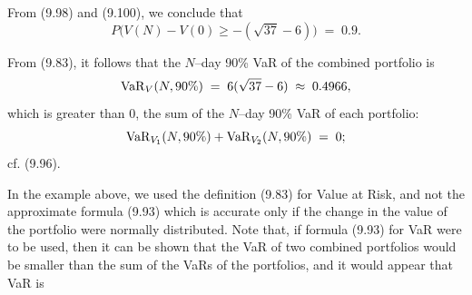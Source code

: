 From (9.98) and (9.100), we conclude that
\[
P\bigl(V(N)-V(0) \ge -(\sqrt{37}-6)\bigr) \;=\; 0.9.
\]

From (9.83), it follows that the $N$--day 90\% VaR of the combined portfolio
is
\begin{equation}
\operatorname{VaR}_V(N,90\%) \;=\; 6(\sqrt{37}-6) \;\approx\; 0.4966,
\end{equation}
which is greater than 0, the sum of the $N$--day 90\% VaR of each portfolio:
\[
\operatorname{VaR}_{V_1}(N,90\%) + \operatorname{VaR}_{V_2}(N,90\%) \;=\; 0;
\]
cf. (9.96).

In the example above, we used the definition (9.83) for Value at Risk, and
not the approximate formula (9.93) which is accurate only if the change in
the value of the portfolio were normally distributed. Note that, if formula
(9.93) for VaR were to be used, then it can be shown that the VaR of two
combined portfolios would be smaller than the sum of the VaRs of the
portfolios, and it would appear that VaR is
